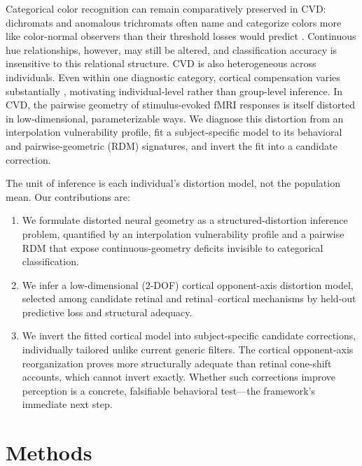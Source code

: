 \documentclass{article}
\begin{document}
Categorical color recognition can remain comparatively preserved in CVD: dichromats and anomalous trichromats often name and categorize colors more like color-normal observers than their threshold losses would predict \citep{bonnardel2006,emery2021cvd}.
Continuous hue relationships, however, may still be altered, and classification accuracy is insensitive to this relational structure.
CVD is also heterogeneous across individuals.
Even within one diagnostic category, cortical compensation varies substantially \citep{tregillus2021}, motivating individual-level rather than group-level inference.
In CVD, the pairwise geometry of stimulus-evoked fMRI responses is itself distorted in low-dimensional, parameterizable ways.
We diagnose this distortion from an interpolation vulnerability profile, fit a subject-specific model to its behavioral and pairwise-geometric (RDM) signatures, and invert the fit into a candidate correction.

The unit of inference is each individual's distortion model, not the population mean.
Our contributions are:
\begin{enumerate}
    \item We formulate distorted neural geometry as a structured-distortion inference problem, quantified by an interpolation vulnerability profile and a pairwise RDM that expose continuous-geometry deficits invisible to categorical classification.
    \item We infer a low-dimensional (2-DOF) cortical opponent-axis distortion model, selected among candidate retinal and retinal--cortical mechanisms by held-out predictive loss and structural adequacy.
    \item We invert the fitted cortical model into subject-specific candidate corrections, individually tailored unlike current generic filters. The cortical opponent-axis reorganization proves more structurally adequate than retinal cone-shift accounts, which cannot invert exactly. Whether such corrections improve perception is a concrete, falsifiable behavioral test---the framework's immediate next step.
\end{enumerate}

\section{Methods}
\label{sec:methods}
\end{document}
